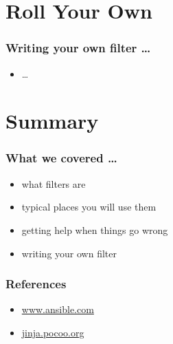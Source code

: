 \documentclass[pdf]{beamer}
\begin{document}
\section{Roll Your Own}

\begin{frame}
  \frametitle{Writing your own filter \ldots}
  \begin{itemize}
    \item{\ldots}
  \end{itemize}
\end{frame}

\section{Summary}

\begin{frame}
  \frametitle{What we covered \ldots}
    \pause{}
  \begin{itemize}
    \item{what filters are}
      \pause{}
    \item{typical places you will use them}
      \pause{}
    \item{getting help when things go wrong}
      \pause{}
    \item{writing your own filter}
  \end{itemize}
\end{frame}

\begin{frame}
  \frametitle{References}
  \begin{itemize}
    \item{ \href{https://www.ansible.com/}{www.ansible.com} }
    \item{ \href{http://jinja.pocoo.org/}{jinja.pocoo.org} }
  \end{itemize}
\end{frame}
\end{document}
